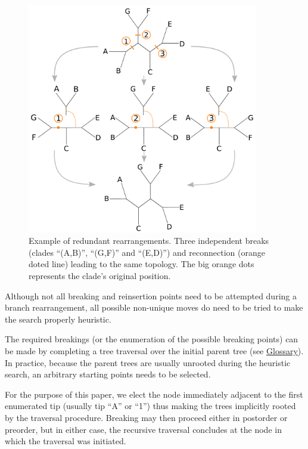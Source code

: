 \documentclass[12pt,letterpaper]{article}
\begin{document}
\begin{figure}[!htbp]
\centering
   \includegraphics[width=0.9\textwidth]{Figure/Figure_Redundantswaps.pdf}
\caption{Example of redundant rearrangements. Three independent breaks (clades ``(A,B)'', ``(G,F)'' and ``(E,D)'') and reconnection (orange doted line) leading to the same topology. The big orange dots represents the clade's original position.}
\label{Figure_redundant}
\end{figure}

Although not all breaking and reinsertion points need to be attempted during a branch rearrangement, all possible non-unique moves do need to be tried to make the search properly heuristic. 

The required breakings (or the enumeration of the possible breaking points) can be made by completing a tree traversal over the initial parent tree (see \hyperref[Glossary]{Glossary}).
In practice, because the parent trees are usually unrooted during the heuristic search, an arbitrary starting points needs to be selected.

For the purpose of this paper, we elect the node immediately adjacent to the first enumerated tip (usually tip ``A'' or ``1'') thus making the trees implicitly rooted by the traversal procedure.
Breaking may then proceed either in postorder or preorder, but in either case, the recursive traversal concludes at the node in which the traversal was initiated.
\end{document}
